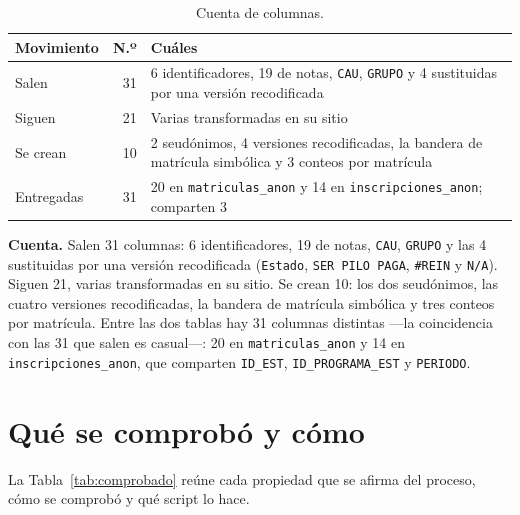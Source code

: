 \documentclass[11pt,a4paper,twoside,twocolumn]{article}
\newcommand{\cod}[1]{\nolinkurl{#1}}
\newcommand{\cab}[1]{\textcolor{ustaAzul}{\textbf{#1}}}
\begin{document}
\begin{table}[!ht]
\centering
\caption{Cuenta de columnas.}
\label{tab:cuenta}
\footnotesize
\begin{tabularx}{\columnwidth}{@{}P{2.0cm} r L@{}}
\toprule
\cab{Movimiento} & \cab{N.º} & \cab{Cuáles} \\
\midrule
Salen & 31 & 6 identificadores, 19 de notas, \cod{CAU}, \cod{GRUPO} y 4 sustituidas por una versión recodificada \\
Siguen & 21 & Varias transformadas en su sitio \\
Se crean & 10 & 2 seudónimos, 4 versiones recodificadas, la bandera de matrícula simbólica y 3 conteos por matrícula \\
\midrule
Entregadas & 31 & 20 en \cod{matriculas_anon} y 14 en \cod{inscripciones_anon}; comparten 3 \\
\bottomrule
\end{tabularx}
\end{table}

\textbf{Cuenta.} Salen 31 columnas: 6 identificadores, 19 de notas, \cod{CAU}, \cod{GRUPO} y las 4
sustituidas por una versión recodificada (\cod{Estado}, \texttt{SER PILO PAGA}, \texttt{\#REIN} y
\cod{N/A}). Siguen 21, varias transformadas en su sitio. Se crean 10: los dos seudónimos, las
cuatro versiones recodificadas, la bandera de matrícula simbólica y tres conteos por matrícula.
Entre las dos tablas hay 31 columnas distintas ---la coincidencia con las 31 que salen es
casual---: 20 en \cod{matriculas_anon} y 14 en \cod{inscripciones_anon}, que comparten
\cod{ID_EST}, \cod{ID_PROGRAMA_EST} y \cod{PERIODO}.

\section{Qué se comprobó y cómo}\label{sec:comprobado}

La Tabla~\ref{tab:comprobado} reúne cada propiedad que se afirma del proceso, cómo se comprobó y
qué script lo hace.
\end{document}
